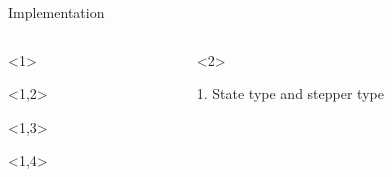 \documentclass[@BEAMER_OPTIONS@]{beamer}
\begin{document}
\begin{frame}[fragile]{Implementation}
    \vspace{-1\baselineskip}
    \begin{columns}
        \begin{column}[c]{0.35\textwidth}
            \begin{exampleblock}{}
                \begin{adjustbox}{width=0.42\textwidth, height=\textheight, keepaspectratio}
                    \begin{minipage}{\textwidth}
                        \begin{uncoverenv}<1>
                            
                        \end{uncoverenv}
                        \begin{uncoverenv}<1,2>
                            
                        \end{uncoverenv}
                        \begin{uncoverenv}<1,3>
                            
                        \end{uncoverenv}
                        \begin{uncoverenv}<1,4>
                            
                        \end{uncoverenv}
                    \end{minipage}
                \end{adjustbox}
            \end{exampleblock}
        \end{column}
        \begin{column}[c]{0.62\textwidth}
            \begin{onlyenv}<2>
                \begin{exampleblock}{1. State type and stepper type}
                    \begin{adjustbox}{width=0.75\textwidth, height=\textheight, keepaspectratio}
                        \begin{minipage}{\textwidth}
                            

\end{minipage}
\end{adjustbox}
\end{exampleblock}
\end{onlyenv}
\end{column}
\end{columns}
\end{frame}
\end{document}
